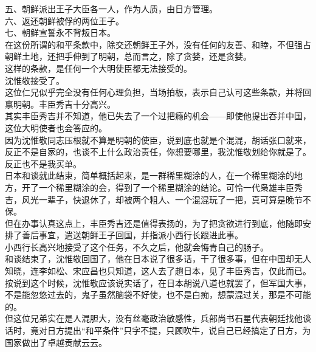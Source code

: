 \begin{multicols}{\theparacolNo}
五、朝鲜派出王子大臣各一人，作为人质，由日方管理。\\

六、返还朝鲜被俘的两位王子。\\

七、朝鲜宣誓永不背叛日本。\\

在这份所谓的和平条款中，除交还朝鲜王子外，没有任何的友善、和睦，不但强占朝鲜土地，还把手伸到了明朝，总而言之，除了贪婪，还是贪婪。\\

这样的条款，是任何一个大明使臣都无法接受的。\\

沈惟敬接受了。\\

这位仁兄似乎完全没有任何心理负担，当场拍板，表示自己认可这些条款，并将回禀明朝。丰臣秀吉十分高兴。\\

其实丰臣秀吉并不知道，他已失去了一个过把瘾的机会——即使他提出吞并中国，这位大明使者也会答应的。\\

因为沈惟敬同志压根就不算是明朝的使臣，说到底也就是个混混，胡话张口就来，反正不是自家的，也谈不上什么政治责任，你想要哪里，我沈惟敬划给你就是了。反正也不是我买单。\\

日本和谈就此结束，简单概括起来，是一群稀里糊涂的人，在一个稀里糊涂的地方，开了一个稀里糊涂的会，得到了一个稀里糊涂的结论。可怜一代枭雄丰臣秀吉，风光一辈子，快退休了，却被两个粗人、一个混混玩了一把，真可算是晚节不保。\\

但在办事认真这点上，丰臣秀吉还是值得表扬的，为了把贪欲进行到底，他随即安排了善后事宜，遣送朝鲜王子回国，并指派小西行长跟进此事。\\

小西行长高兴地接受了这个任务，不久之后，他就会悔青自己的肠子。\\

和谈结束了，沈惟敬回国了，他在日本说了很多话，干了很多事，但在中国却无人知晓，连李如松、宋应昌也只知道，这人去了趟日本，见了丰臣秀吉，仅此而已。\\

按说到这个时候，沈惟敬应该说实话了，在日本胡说八道也就罢了，但军国大事，不是能忽悠过去的，鬼子虽然脑袋不好使，也不是白痴，想蒙混过关，那是不可能的。\\

但这位兄弟实在是人混胆大，没有丝毫政治敏感性，兵部尚书石星代表朝廷找他谈话时，竟对日方提出“和平条件”只字不提，只顾吹牛，说自己已经搞定了日方，为国家做出了卓越贡献云云。\\


\end{multicols}
